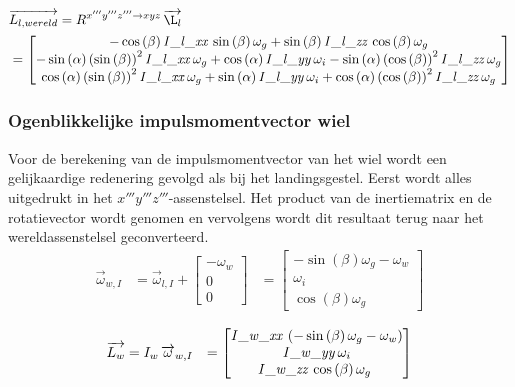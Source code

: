 \begin{align*}
&\overrightarrow{L_{l,wereld}}=R^{x'''y'''z''' \rightarrow xyz}\,\overrightarrow{\L_{l}}\\
&=
\begin{bmatrix}
-\cos \left( \beta \right){\it I\_l\_xx}\,\sin \left( \beta \right) \omega_{g}+\sin \left( \beta \right) {\it 
I\_l\_zz}\,\cos \left( \beta \right) \omega_{g}
\\ 
-\sin \left( \alpha \right)  \left( \sin \left( \beta \right)  \right) 
^{2}{\it I\_l\_xx}\,\omega_{g}+\cos \left( \alpha \right) {\it 
I\_l\_yy}\,\omega_{i}-\sin \left( \alpha \right)  \left( \cos \left( 
\beta \right)  \right) ^{2}{\it I\_l\_zz}\,\omega_{g}
\\ 
\cos \left( \alpha \right)  \left( \sin \left( \beta \right)  \right) ^{2}{\it I\_l\_xx}\,\omega_{g}+\sin \left( \alpha \right) {\it I\_l\_yy}\,\omega_{i}+\cos \left( \alpha \right) \left( \cos \left( \beta \right)  \right) ^{2}{\it I\_l\_zz}\,\omega_
{g}
\end{bmatrix}
\end{align*}

\subsubsection{Ogenblikkelijke impulsmomentvector wiel}
Voor de berekening van de impulsmomentvector van het wiel wordt een gelijkaardige redenering gevolgd als bij het landingsgestel. Eerst wordt alles uitgedrukt in het $x'''y'''z'''$-assenstelsel. Het product van de inertiematrix en de rotatievector wordt genomen en vervolgens wordt dit resultaat terug naar het wereldassenstelsel geconverteerd.
\begin{equation*}
\begin{split}
\overrightarrow{\omega}_{w,I}
&=\overrightarrow{\omega}_{l,I}+
\begin{bmatrix}
-\omega_{w}\\
0\\
0\
\end{bmatrix}
&=\begin{bmatrix}
-\sin \left( \beta \right) \omega_{g}-\omega
_{w}\\
\omega_{i}\\
\cos \left( 
\beta \right) \omega_{g}\
\end{bmatrix}
\end{split}
\end{equation*}

\begin{equation}
\begin{split}
\overrightarrow{L_{w}}&=I_{w}\,\overrightarrow{\omega}_{w,I}&=
\begin{bmatrix}
{\it I\_w\_xx}\, \left( -\sin \left( \beta
 \right) \omega_{g}-\omega_{w} \right) \\
{\it 
I\_w\_yy}\,\omega_{i}\\
{\it I\_w\_zz}\,\cos \left( 
\beta \right) \omega_{g}\
\end{bmatrix}
\end{split}
\end{equation}

